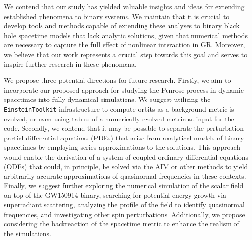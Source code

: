 We contend that our study has yielded valuable insights and ideas for extending established phenomena to binary systems. We maintain that it is crucial to develop tools and methods capable of extending these analyses to binary black hole spacetime models that lack analytic solutions, given that numerical methods are necessary to capture the full effect of nonlinear interaction in \ac{GR}. Moreover, we believe that our work represents a crucial step towards this goal and serves to inspire further research in these phenomena.

We propose three potential directions for future research. Firstly, we aim to incorporate our proposed approach for studying the Penrose process in dynamic spacetimes into fully dynamical simulations. We suggest utilizing the \texttt{EinsteinToolkit} infrastructure to compute orbits as a background metric is evolved, or even using tables of a numerically evolved metric as input for the code. Secondly, we contend that it may be possible to separate the perturbation partial differential equations (PDEs) that arise from analytical models of binary spacetimes by employing series approximations to the solutions. This approach would enable the derivation of a system of coupled ordinary differential equations (ODEs) that could, in principle, be solved via the \ac{AIM} or other methods to yield arbitrarily accurate approximations of quasinormal frequencies in these contexts. Finally, we suggest further exploring the numerical simulation of the scalar field on top of the GW150914 binary, searching for potential energy growth via superradiant scattering, analyzing the profile of the field to identify quasinormal frequencies, and investigating other spin perturbations. Additionally, we propose considering the backreaction of the spacetime metric to enhance the realism of the simulations.